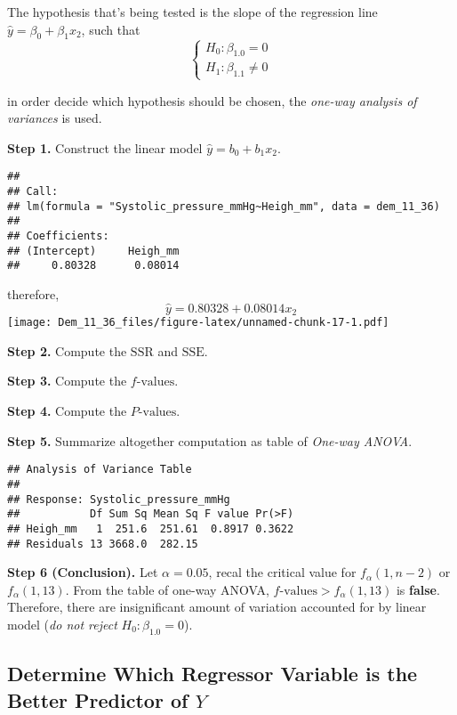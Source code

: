 \documentclass[
]{article}
\begin{document}
The hypothesis that's being tested is the slope of the regression line
\(\hat{y} = \beta_0 + \beta_1x_2\), such that \[
\begin{cases}
H_0:\beta_{1.0} = 0 \\
H_1:\beta_{1.1} \neq 0
\end{cases}
\]

in order decide which hypothesis should be chosen, the \emph{one-way
analysis of variances} is used.

\textbf{Step 1.} Construct the linear model \(\hat{y} = b_0 + b_1x_2\).

\begin{verbatim}
## 
## Call:
## lm(formula = "Systolic_pressure_mmHg~Heigh_mm", data = dem_11_36)
## 
## Coefficients:
## (Intercept)     Heigh_mm  
##     0.80328      0.08014
\end{verbatim}

therefore, \[\hat{y} = 0.80328 + 0.08014x_2\]
\texttt{[image: Dem\_11\_36\_files/figure-latex/unnamed-chunk-17-1.pdf]}

\textbf{Step 2.} Compute the \(\text{SSR}\) and \(\text{SSE}\).

\textbf{Step 3.} Compute the \(f\text{-values}\).

\textbf{Step 4.} Compute the \(P\text{-values}\).

\textbf{Step 5.} Summarize altogether computation as table of
\emph{One-way ANOVA}.

\begin{verbatim}
## Analysis of Variance Table
## 
## Response: Systolic_pressure_mmHg
##           Df Sum Sq Mean Sq F value Pr(>F)
## Heigh_mm   1  251.6  251.61  0.8917 0.3622
## Residuals 13 3668.0  282.15
\end{verbatim}

\textbf{Step 6 (Conclusion).} Let \(\alpha = 0.05\), recal the critical
value for \(f_\alpha(1, n - 2)\) or \(f_\alpha(1, 13)\). From the table
of one-way ANOVA, \(f\text{-values} > f_\alpha(1,13)\) is
\textbf{false}. Therefore, there are insignificant amount of variation
accounted for by linear model (\emph{do not reject}
\(H_0 : \beta_{1.0} = 0\)).

\hypertarget{determine-which-regressor-variable-is-the-better-predictor-of-y}{%
\subsection{\texorpdfstring{Determine Which Regressor Variable is the
Better Predictor of
\(Y\)}{Determine Which Regressor Variable is the Better Predictor of Y}}\label{determine-which-regressor-variable-is-the-better-predictor-of-y}}
\end{document}
